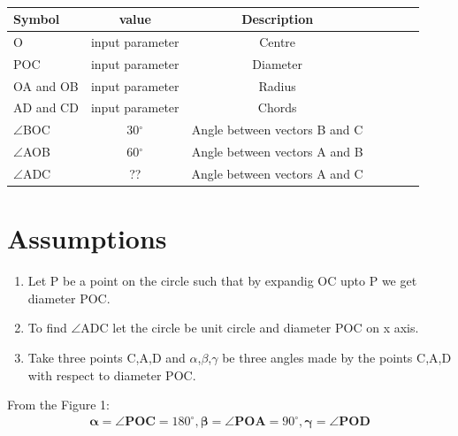 \documentclass[12pt]{article}
\let\vec\mathbf
\begin{document}
\begin{table}[htbp]
 \begin{center}
    \begin{tabular}{|l|c|c|c|c|c|c} \hline \textbf{Symbol}
  & \textbf{value} & \textbf{Description} \\
 \hline
	    O &input parameter & Centre \\ \hline
POC &input parameter& Diameter \\ \hline
OA and OB&input parameter& Radius \\ \hline
AD and CD &input parameter& Chords \\ \hline
$\angle$BOC &30$^\circ$ & Angle between vectors B and C  \\ \hline
$\angle$AOB&60$^\circ$&Angle between vectors A and B\\
	\hline
	$\angle$ADC&??&Angle between vectors A and C \\
	\hline
\end{tabular}   
\end{center}
\caption{\label{table:dummytable} }
\end{table}

\section*{\large Assumptions}
\begin{enumerate}
\item Let P be a point on the circle such that by expandig OC upto P we get diameter POC.
\item To find $\angle$ADC let the circle be unit circle and diameter POC on x axis.
\item Take three points C,A,D  and $\alpha$,$\beta$,$\gamma$ be three angles made by the points C,A,D with respect to diameter POC.
\end{enumerate}
From the Figure 1:
\begin{align}
\vec{\alpha} = \vec{\angle POC}= 180^\circ, 
\vec{\beta} = \vec{\angle POA} = 90^\circ,
\vec{\gamma} = \vec{\angle POD}
\end{align}
\end{document}

